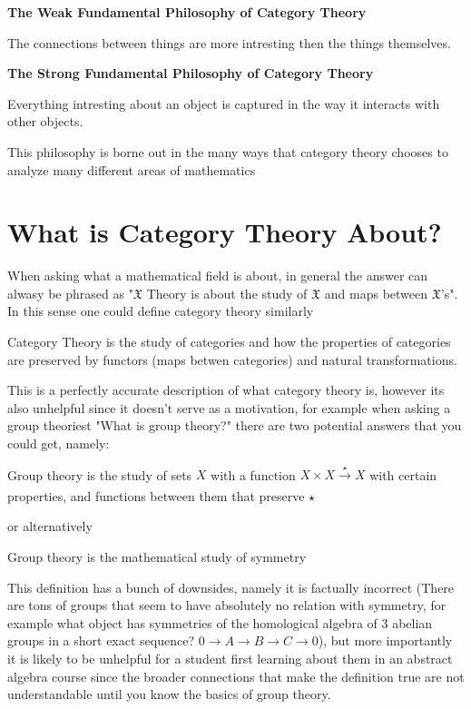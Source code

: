 
\maketitle

\begin{center}
  \textbf{The Weak Fundamental Philosophy of Category Theory}

  The connections between things are more intresting then the things themselves.

  \textbf{The Strong Fundamental Philosophy of Category Theory}
  
  Everything intresting about an object is captured in the way it interacts with other objects. \label{phil:cattheory}
\end{center}
This philosophy is borne out in the many ways that category theory chooses to analyze many different areas of mathematics

\section{What is Category Theory About?}

When asking what a mathematical field is about, in general the answer can alwasy be phrased as "$\mathfrak{X}$ Theory is about the study of $\mathfrak{X}$ and maps between $\mathfrak{X}$'s". In this sense one could define category theory similarly
\begin{lie}
    Category Theory is the study of categories and how the properties of categories are preserved by functors (maps betwen categories) and natural transformations.
\end{lie}

This is a perfectly accurate description of what category theory is, however its also unhelpful since it doesn't serve as a motivation, for example when asking a group theoriest "What is group theory?" there are two potential answers that you could get, namely:
\begin{lie}
    Group theory is the study of sets $X$ with a function $X \times X \xrightarrow[]{\star} X$ with certain properties, and functions between them that preserve $\star$
\end{lie}
or alternatively
\begin{lie}
    Group theory is the mathematical study of symmetry
\end{lie}
This definition has a bunch of downsides, namely it is factually incorrect (There are tons of groups that seem to have absolutely no relation with symmetry, for example what object has symmetries of the homological algebra of 3 abelian groups in a short exact sequence? $0 \rightarrow A \rightarrow B \rightarrow C \rightarrow 0$), but more importantly it is likely to be unhelpful for a student first learning about them in an abstract algebra course since the broader connections that make the definition true are not understandable until you know the basics of group theory.

